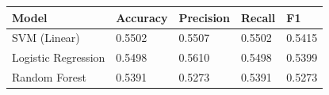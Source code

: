 \begin{tabular}{lllll}
\toprule
Model & Accuracy & Precision & Recall & F1 \\
\midrule
SVM (Linear) & 0.5502 & 0.5507 & 0.5502 & 0.5415 \\
Logistic Regression & 0.5498 & 0.5610 & 0.5498 & 0.5399 \\
Random Forest & 0.5391 & 0.5273 & 0.5391 & 0.5273 \\
\bottomrule
\end{tabular}

